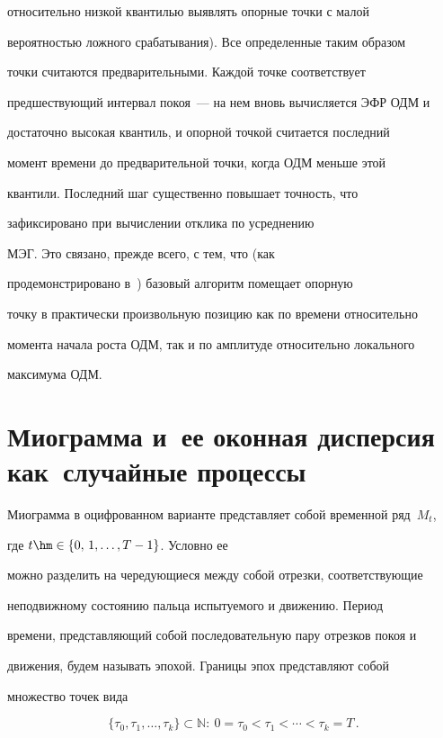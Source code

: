 относительно низкой квантилью выявлять опорные точки с малой


вероятностью ложного срабатывания). Все определенные таким образом


точки считаются предварительными. Каждой точке соответствует


предшествующий интервал покоя~--- на нем вновь вычисляется ЭФР ОДМ и


достаточно высокая квантиль, и опорной точкой считается последний


момент времени до предварительной точки, когда ОДМ меньше этой


квантили. Последний шаг существенно повышает точность, что


зафиксировано при вычислении отклика по усреднению


МЭГ. Это связано, прежде всего, с тем, что (как


продемонстрировано в~\cite{bi_4}) базовый алгоритм помещает опорную


точку в практически произвольную позицию как по времени относительно


момента начала роста ОДМ, так и по амплитуде относительно локального


максимума ОДМ.





\section{Миограмма и~ее оконная дисперсия как~случайные процессы}





Миограмма в оцифрованном варианте представляет собой временной ряд~$M_t$,


где $t \hm\in \{0,\, 1, \ldots ,  T-1\}$. Условно ее


можно разделить на чередующиеся между собой отрезки, соответствующие


неподвижному состоянию пальца испытуемого и движению. Период


времени, представляющий собой последовательную пару отрезков покоя и


движения, будем называть эпохой. Границы эпох представляют собой


множество точек вида


\begin{equation*}


    \{\tau_0 , \tau_1 , \ldots , \tau_k\} \subset


    \mathbb{N} :\ 0 = \tau_0 < \tau_1 < \cdots < \tau_k = T\,.


\end{equation*}


